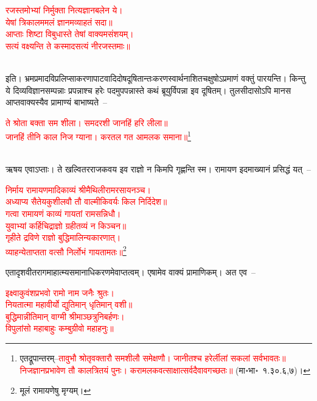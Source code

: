 \centering\textcolor{red}{रजस्तमोभ्यां निर्मुक्ता नित्यज्ञानबलेन ये।\nopagebreak\\
येषां त्रिकालममलं ज्ञानमव्याहतं सदा॥\nopagebreak\\
आप्ताः शिष्टा विबुधास्ते तेषां वाक्यमसंशयम्।\nopagebreak\\
सत्यं वक्ष्यन्ति ते कस्मादसत्यं नीरजस्तमाः॥}\nopagebreak\\
\\
\begin{sloppypar}\justifying\noindent इति। भ्रम\-प्रमाद\-विप्रलिप्सा\-करणापाटवादि\-दोष\-दूषितान्तः\-करण\-स्वार्थ\-नाशित\-चक्षुषो\-ऽप्रमाणं वक्तुं पारयन्ति। किन्तु ये दिव्य\-विज्ञान\-सम्पन्नाः प्रपन्नाश्च हरेः पदमुपपन्नास्ते कथं ब्रूयुर्विपन्ना इव दूषितम्। तुलसीदासोऽपि मानस आप्त\-वाक्यस्यैव प्रामाण्यं बाभाष्यते~–\end{sloppypar}
\centering\textcolor{red}{ते श्रोता बक्ता सम शीला। समदरशी जानहिं हरि लीला॥\nopagebreak\\
जानहिं तीनि काल निज ग्याना। करतल गत आमलक समाना॥}\footnote{एतद्रूपान्तरम्–\textcolor{red}{तावुभौ श्रोतृवक्तारौ समशीलौ समेक्षणौ। जानीतश्च हरेर्लीलां सकलां सर्वभावतः॥ निजज्ञानप्रभावेण तौ कालत्रितयं पुनः। करामलकवत्साक्षात्सर्वदैवावगच्छतः॥} (मा॰भा॰~१.३०.६,७)।}\nopagebreak\\
\\
\begin{sloppypar}\justifying\noindent ऋषय एवाऽप्ताः। ते खल्वितर\-राज\-कवय इव राज्ञो न किमपि गृह्णन्ति स्म। रामायण इदमाख्यानं प्रसिद्धं यत्~–\end{sloppypar}
\centering\textcolor{red}{निर्माय रामायणमादिकाव्यं श्रीमैथिलीरामरसायनञ्च।\nopagebreak\\
अध्याप्य सैतेयकुशीलवौ तौ वाल्मीकिवर्यः किल निर्दिदेश॥\\
गत्वा रामायणं काव्यं गायतां रामसन्निधौ।\nopagebreak\\
युवाभ्यां कर्हिचिद्राज्ञो ग्रहीतव्यं न किञ्चन॥\\
गृहीते द्रविणे राज्ञो बुद्धिमालिन्यकारणात्।\nopagebreak\\
व्याहन्येताप्तता वत्सौ निर्लोभं गायतामतः॥}\footnote{मूलं रामायणेषु मृग्यम्।}\nopagebreak\\
\begin{sloppypar}\justifying\noindent एतादृश\-वीत\-राग\-माहात्म्य\-समानाधिकरणमेवाप्तत्वम्। एषामेव वाक्यं प्रामाणिकम्। अत एव~–\end{sloppypar}
\centering\textcolor{red}{इक्ष्वाकुवंशप्रभवो रामो नाम जनैः श्रुतः। \nopagebreak\\
नियतात्मा महावीर्यो द्युतिमान् धृतिमान् वशी॥\nopagebreak\\
बुद्धिमान्नीतिमान् वाग्मी श्रीमाञ्छत्रुनिबर्हणः। \nopagebreak\\
विपुलांसो महाबाहुः कम्बुग्रीवो महाहनुः॥}\nopagebreak\\
